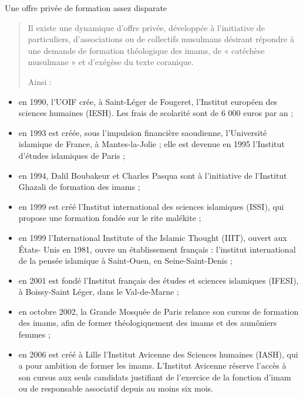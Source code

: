 Une offre privée de formation assez disparate

\begin{quote}
Il existe une dynamique d'offre privée, développée à l'initiative de
particuliers, d'associations ou de collectifs musulmans désirant
répondre à une demande de formation théologique des imams, de «
catéchèse musulmane » et d'exégèse du texte coranique.

Ainsi :
\end{quote}

\begin{itemize}
\item
  en 1990, l'UOIF crée, à Saint-Léger de Fougeret, l'Institut européen
  des sciences humaines (IESH). Les frais de scolarité sont de 6 000
  euros par an ;
\item
  en 1993 est créée, sous l'impulsion financière saoudienne,
  l'Université islamique de France, à Mantes-la-Jolie ; elle est devenue
  en 1995 l'Institut d'études islamiques de Paris ;
\item
  en 1994, Dalil Boubakeur et Charles Pasqua sont à l'initiative de
  l'Institut Ghazali de formation des imams ;
\item
  en 1999 est créé l'Institut international des sciences islamiques
  (ISSI), qui propose une formation fondée sur le rite malékite ;
\item
  en 1999 l'International Institute of the Islamic Thought (IIIT),
  ouvert aux États- Unis en 1981, ouvre un établissement français :
  l'institut international de la pensée islamique à Saint-Ouen, en
  Seine-Saint-Denis ;
\item
  en 2001 est fondé l'Institut français des études et sciences
  islamiques (IFESI), à Boissy-Saint Léger, dans le Val-de-Marne ;
\item
  en octobre 2002, la Grande Mosquée de Paris relance son cursus de
  formation des imams, afin de former théologiquement des imams et des
  aumôniers femmes ;
\end{itemize}

\begin{quote}

\end{quote}

\begin{itemize}
\item
  en 2006 est créé à Lille l'Institut Avicenne des Sciences humaines
  (IASH), qui a pour ambition de former les imams. L'Institut Avicenne
  réserve l'accès à son cursus aux seuls candidats justifiant de
  l'exercice de la fonction d'imam ou de responsable associatif depuis
  au moins six mois.
\end{itemize}

